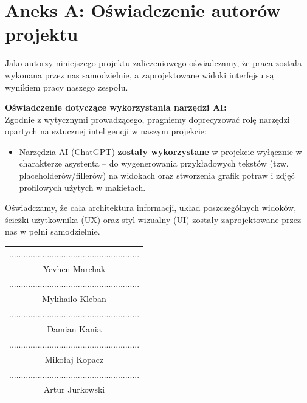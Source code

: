 \chapter*{Aneks A: Oświadczenie autorów projektu}

Jako autorzy niniejszego projektu zaliczeniowego oświadczamy, że praca została wykonana przez nas samodzielnie, a zaprojektowane widoki interfejsu są wynikiem pracy naszego zespołu.

\vspace{0.5cm}
\noindent\textbf{Oświadczenie dotyczące wykorzystania narzędzi AI:} \\
Zgodnie z wytycznymi prowadzącego, pragniemy doprecyzować rolę narzędzi opartych na sztucznej inteligencji w naszym projekcie:

\begin{itemize}
    \item Narzędzia AI (ChatGPT) \textbf{zostały wykorzystane} w projekcie wyłącznie w charakterze asystenta – do wygenerowania przykładowych tekstów (tzw. placeholderów/fillerów) na widokach oraz stworzenia grafik potraw i zdjęć profilowych użytych w makietach.
\end{itemize}

Oświadczamy, że cała architektura informacji, układ poszczególnych widoków, ścieżki użytkownika (UX) oraz styl wizualny (UI) zostały zaprojektowane przez nas w pełni samodzielnie.

\vspace{1.5cm}
\begin{flushright}
\begin{tabular}{c}
....................................................... \\
Yevhen Marchak \\[0.5cm]
....................................................... \\
Mykhailo Kleban \\[0.5cm]
....................................................... \\
Damian Kania \\[0.5cm]
....................................................... \\
Mikołaj Kopacz \\[0.5cm]
....................................................... \\
Artur Jurkowski \\
\end{tabular}
\end{flushright}